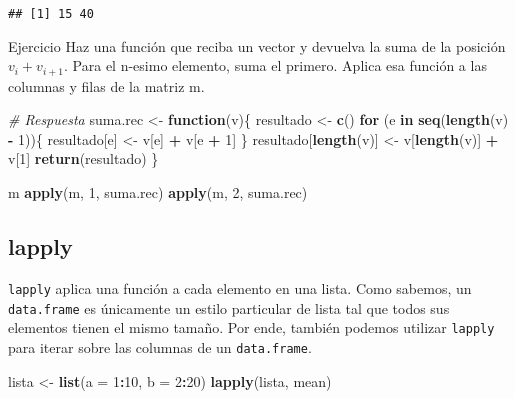 \documentclass[]{article}
\newenvironment{Shaded}{\begin{snugshade}}{\end{snugshade}}
\newcommand{\KeywordTok}[1]{\textcolor[rgb]{0.13,0.29,0.53}{\textbf{#1}}}
\newcommand{\DataTypeTok}[1]{\textcolor[rgb]{0.13,0.29,0.53}{#1}}
\newcommand{\DecValTok}[1]{\textcolor[rgb]{0.00,0.00,0.81}{#1}}
\newcommand{\StringTok}[1]{\textcolor[rgb]{0.31,0.60,0.02}{#1}}
\newcommand{\CommentTok}[1]{\textcolor[rgb]{0.56,0.35,0.01}{\textit{#1}}}
\newcommand{\ControlFlowTok}[1]{\textcolor[rgb]{0.13,0.29,0.53}{\textbf{#1}}}
\newcommand{\OperatorTok}[1]{\textcolor[rgb]{0.81,0.36,0.00}{\textbf{#1}}}
\newcommand{\NormalTok}[1]{#1}
\begin{document}
\begin{verbatim}
## [1] 15 40
\end{verbatim}

\renewcommand\bcStyleTitre[1]{\large\textcolor{bbblack}{#1}}

\begin{bclogo}[
  couleur=llred,
  arrondi=0,
  logo=\bcstop,
  barre=none,
  noborder=true]{Ejercicio}
Haz una función que reciba un vector y devuelva la suma de la 
posición $v_i + v_{i + 1}$. Para el n-esimo elemento, suma el primero.
Aplica esa función a las columnas y filas de la matriz m.
\end{bclogo}

\begin{Shaded}
\begin{Highlighting}[]
\CommentTok{# Respuesta}
\NormalTok{suma.rec <-}\StringTok{ }\ControlFlowTok{function}\NormalTok{(v)\{}
\NormalTok{  resultado <-}\StringTok{ }\KeywordTok{c}\NormalTok{()}
  \ControlFlowTok{for}\NormalTok{ (e }\ControlFlowTok{in} \KeywordTok{seq}\NormalTok{(}\KeywordTok{length}\NormalTok{(v) }\OperatorTok{-}\StringTok{ }\DecValTok{1}\NormalTok{))\{}
\NormalTok{    resultado[e] <-}\StringTok{ }\NormalTok{v[e] }\OperatorTok{+}\StringTok{ }\NormalTok{v[e }\OperatorTok{+}\StringTok{ }\DecValTok{1}\NormalTok{]}
\NormalTok{  \}}
\NormalTok{  resultado[}\KeywordTok{length}\NormalTok{(v)] <-}\StringTok{ }\NormalTok{v[}\KeywordTok{length}\NormalTok{(v)] }\OperatorTok{+}\StringTok{ }\NormalTok{v[}\DecValTok{1}\NormalTok{]}
  \KeywordTok{return}\NormalTok{(resultado)}
\NormalTok{\}}

\NormalTok{m}
\KeywordTok{apply}\NormalTok{(m, }\DecValTok{1}\NormalTok{, suma.rec)}
\KeywordTok{apply}\NormalTok{(m, }\DecValTok{2}\NormalTok{, suma.rec)}
\end{Highlighting}
\end{Shaded}

\subsection{lapply}\label{lapply}

\texttt{lapply} aplica una función a cada elemento en una lista. Como
sabemos, un \texttt{data.frame} es únicamente un estilo particular de
lista tal que todos sus elementos tienen el mismo tamaño. Por ende,
también podemos utilizar \texttt{lapply} para iterar sobre las columnas
de un \texttt{data.frame}.

\begin{Shaded}
\begin{Highlighting}[]
\NormalTok{lista <-}\StringTok{ }\KeywordTok{list}\NormalTok{(}\DataTypeTok{a =} \DecValTok{1}\OperatorTok{:}\DecValTok{10}\NormalTok{, }\DataTypeTok{b =} \DecValTok{2}\OperatorTok{:}\DecValTok{20}\NormalTok{)}
\KeywordTok{lapply}\NormalTok{(lista, mean)}
\end{Highlighting}
\end{Shaded}
\end{document}
